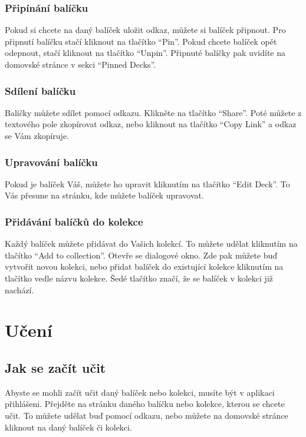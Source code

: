 \documentclass[a4paper,12pt]{article}
\begin{document}
\subsubsection*{Připínání balíčku}
Pokud si chcete na daný balíček uložit odkaz, můžete si balíček připnout. Pro připnutí balíčku stačí kliknout na tlačítko \enquote{Pin}. Pokud chcete balíček opět odepnout, stačí kliknout na tlačítko \enquote{Unpin}. Připnuté balíčky pak uvidíte na domovské stránce v sekci \enquote{Pinned Decks}.

\subsubsection*{Sdílení balíčku}
Balíčky můžete sdílet pomocí odkazu. Klikněte na tlačítko \enquote{Share}. Poté můžete z textového pole zkopírovat odkaz, nebo kliknout na tlačítko \enquote{Copy Link} a odkaz se Vám zkopíruje.

\subsubsection*{Upravování balíčku}
Pokud je balíček Váš, můžete ho upravit kliknutím na tlačítko \enquote{Edit Deck}. To Vás přesune na stránku, kde můžete balíček upravovat.

\subsubsection*{Přidávání balíčků do kolekce}
Každý balíček můžete přidávat do Vašich kolekcí. To můžete udělat kliknutím na tlačítko \enquote{Add to collection}. Otevře se dialogové okno. Zde pak můžete buď vytvořit novou kolekci, nebo přidat balíček do existující kolekce kliknutím na tlačítko vedle názvu kolekce. Šedé tlačítko značí, že se balíček v kolekci již nachází.

\section{Učení}
\subsection{Jak se začít učit}
Abyste se mohli začít učit daný balíček nebo kolekci, musíte být v aplikaci přihlášeni. Přejděte na stránku daného balíčku nebo kolekce, kterou se chcete učit. To můžete udělat buď pomocí odkazu, nebo můžete na domovské stránce kliknout na daný balíček či kolekci.
\end{document}
